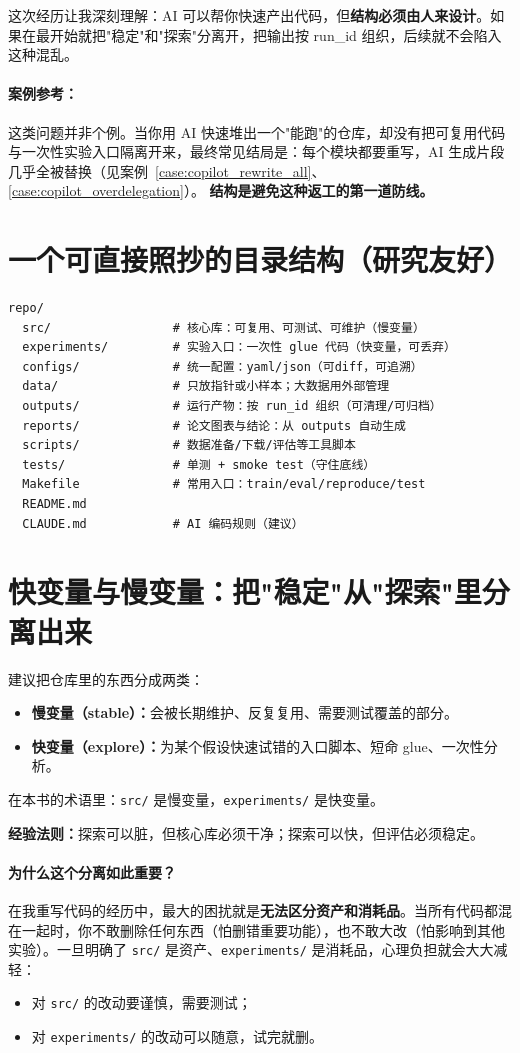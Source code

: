 这次经历让我深刻理解：AI 可以帮你快速产出代码，但\textbf{结构必须由人来设计}。如果在最开始就把"稳定"和"探索"分离开，把输出按 run\_id 组织，后续就不会陷入这种混乱。

\paragraph{案例参考：}这类问题并非个例。当你用 AI 快速堆出一个"能跑"的仓库，却没有把可复用代码与一次性实验入口隔离开来，最终常见结局是：每个模块都要重写，AI 生成片段几乎全被替换（见案例~\ref{case:copilot_rewrite_all}、\ref{case:copilot_overdelegation}）。
\textbf{结构是避免这种返工的第一道防线。}

\section{一个可直接照抄的目录结构（研究友好）}
\begin{verbatim}
repo/
  src/                 # 核心库：可复用、可测试、可维护（慢变量）
  experiments/         # 实验入口：一次性 glue 代码（快变量，可丢弃）
  configs/             # 统一配置：yaml/json（可diff，可追溯）
  data/                # 只放指针或小样本；大数据用外部管理
  outputs/             # 运行产物：按 run_id 组织（可清理/可归档）
  reports/             # 论文图表与结论：从 outputs 自动生成
  scripts/             # 数据准备/下载/评估等工具脚本
  tests/               # 单测 + smoke test（守住底线）
  Makefile             # 常用入口：train/eval/reproduce/test
  README.md
  CLAUDE.md            # AI 编码规则（建议）
\end{verbatim}

\section{快变量与慢变量：把"稳定"从"探索"里分离出来}
建议把仓库里的东西分成两类：
\begin{itemize}
  \item \textbf{慢变量（stable）：}会被长期维护、反复复用、需要测试覆盖的部分。
  \item \textbf{快变量（explore）：}为某个假设快速试错的入口脚本、短命 glue、一次性分析。
\end{itemize}

在本书的术语里：\texttt{src/} 是慢变量，\texttt{experiments/} 是快变量。

\textbf{经验法则：}探索可以脏，但核心库必须干净；探索可以快，但评估必须稳定。

\paragraph{为什么这个分离如此重要？}在我重写代码的经历中，最大的困扰就是\textbf{无法区分资产和消耗品}。当所有代码都混在一起时，你不敢删除任何东西（怕删错重要功能），也不敢大改（怕影响到其他实验）。一旦明确了 \texttt{src/} 是资产、\texttt{experiments/} 是消耗品，心理负担就会大大减轻：
\begin{itemize}
  \item 对 \texttt{src/} 的改动要谨慎，需要测试；
  \item 对 \texttt{experiments/} 的改动可以随意，试完就删。
\end{itemize}

